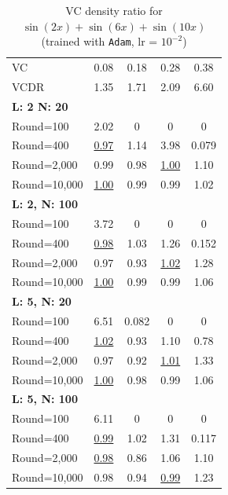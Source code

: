\documentclass[final]{siamart220329}
\newtheorem{theoretical insights}{Theoretical insights}
\newtheorem{practical takeaway}{Practical takeaway}
\begin{document}
{{{\begin{footnotesize}
\begin{table}[htbp]
\centering
\setlength{\tabcolsep}{3pt}  
\begin{minipage}[t]{0.47\textwidth}
\caption{{\ttfamily VC density ratio} for $\sin(2x)$ (trained with \texttt{Adam}, lr = $10^{-2}$)\label{tab1}} \footnotesize
\begin{tabular}{@{}lcccc@{}} 
\toprule
VC & 0.08 & 0.18 & 0.28  & 0.38  \\
VCDR & 1.35 & 1.71 & 2.09 & 6.60 \\
\midrule
\textbf{L: 2 N: 20} &&&&\\
Round=100   & 2.02  & 0 & 0 & 0 \\
Round=400   & \underline{0.97} & 1.14 & 3.98 & 0.079 \\
Round=2,000  & 0.99 & 0.98 & \underline{1.00} & 1.10 \\
Round=10,000 & \underline{1.00} & 0.99 & 0.99 & 1.02 \\
\midrule
\textbf{L: 2, N: 100} &&&&\\
Round=100   & 3.72 & 0 & 0 & 0 \\
Round=400   & \underline{0.98} & 1.03 & 1.26 & 0.152 \\
Round=2,000  & 0.97 & 0.93 & \underline{1.02} & 1.28 \\
Round=10,000 & \underline{1.00} & 0.99 & 0.99 & 1.06 \\
\midrule
\textbf{L: 5, N: 20} &&&&\\
Round=100   & 6.51 & 0.082 & 0 & 0 \\
Round=400   & \underline{1.02} & 0.93 & 1.10 & 0.78 \\
Round=2,000  & 0.97 & 0.92 & \underline{1.01} & 1.33 \\
Round=10,000 & \underline{1.00} & 0.98 & 0.99 & 1.06 \\
\midrule
\textbf{L: 5, N: 100} &&&&\\
Round=100   & 6.11 & 0 & 0 & 0 \\
Round=400   & \underline{0.99} & 1.02 & 1.31 & 0.117 \\
Round=2,000  & \underline{0.98} & 0.86 & 1.06 & 1.10 \\
Round=10,000 & 0.98 & 0.94 & \underline{0.99} & 1.23 \\
\bottomrule
\end{tabular}
\end{minipage}
\hfill
\begin{minipage}[t]{0.52\textwidth}
\caption{{\ttfamily VC density ratio} for $\sin(2x)+\sin(6x)+\sin(10x)$ (trained with \texttt{Adam}, lr = $10^{-2}$)\label{tab2}} \footnotesize 

\end{minipage}
\end{table}
\end{footnotesize}}}}
\end{document}
